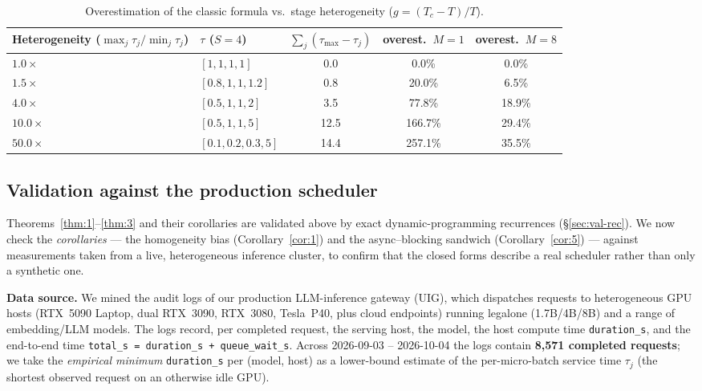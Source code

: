 \documentclass[11pt]{article}
\begin{document}
\begin{table}[htbp]
\centering
\caption{Overestimation of the classic formula vs.\ stage heterogeneity ($g=(T_c-T)/T$).}
\label{tab:bias}
\begin{tabular}{llccc}
\toprule
Heterogeneity ($\max_j\tau_j/\min_j\tau_j$) & $\tau$ ($S{=}4$) & $\sum_j(\tau_{\max}-\tau_j)$ & overest.\ $M{=}1$ & overest.\ $M{=}8$ \\
\midrule
$1.0\times$  & $[1,1,1,1]$        & 0.0  & 0.0\%   & 0.0\% \\
$1.5\times$  & $[0.8,1,1,1.2]$    & 0.8  & 20.0\%  & 6.5\% \\
$4.0\times$  & $[0.5,1,1,2]$      & 3.5  & 77.8\%  & 18.9\% \\
$10.0\times$ & $[0.5,1,1,5]$      & 12.5 & 166.7\% & 29.4\% \\
$50.0\times$ & $[0.1,0.2,0.3,5]$  & 14.4 & 257.1\% & 35.5\% \\
\bottomrule
\end{tabular}
\end{table}

\subsection{Validation against the production scheduler}\label{sec:prod}

Theorems~\ref{thm:1}--\ref{thm:3} and their corollaries are validated above by exact dynamic-programming recurrences (\S\ref{sec:val-rec}). We now check the \emph{corollaries} --- the homogeneity bias (Corollary~\ref{cor:1}) and the async--blocking sandwich (Corollary~\ref{cor:5}) --- against measurements taken from a live, heterogeneous inference cluster, to confirm that the closed forms describe a real scheduler rather than only a synthetic one.

\textbf{Data source.} We mined the audit logs of our production LLM-inference gateway (UIG), which dispatches requests to heterogeneous GPU hosts (RTX~5090 Laptop, dual RTX~3090, RTX~3080, Tesla~P40, plus cloud endpoints) running legalone (1.7B/4B/8B) and a range of embedding/LLM models. The logs record, per completed request, the serving host, the model, the host compute time \texttt{duration\_s}, and the end-to-end time \texttt{total\_s = duration\_s + queue\_wait\_s}. Across 2026-09-03 -- 2026-10-04 the logs contain \textbf{8,571 completed requests}; we take the \emph{empirical minimum} \texttt{duration\_s} per (model, host) as a lower-bound estimate of the per-micro-batch service time $\tau_j$ (the shortest observed request on an otherwise idle GPU).
\end{document}
